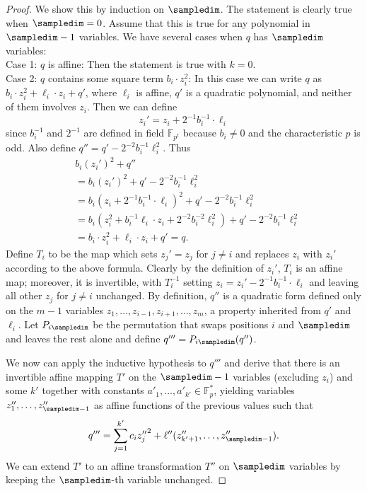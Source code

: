 \begin{proof}
We show this by induction on $\sampledim$. The statement is clearly true when $\sampledim=0$.
Assume that this is true for any polynomial in $\sampledim-1$ variables.
We have several cases when $q$ has $\sampledim$ variables:\\
{\sc Case 1:} $q$ is affine: Then the statement is true with $k=0$.\\
{\sc Case 2:} $q$ contains some square term $b_i\cdot z_i^2$:
In this case we can write $q$ as
$b_i\cdot z_i^2+ \ell_i\cdot z_i+q'$,
where $\ell_i$ is affine, $q'$ is a quadratic polynomial,
and neither of them involves $z_i$.
Then we can define
$$z_i'=z_i+2^{-1}b_i^{-1}\cdot \ell_i$$
since $b_i^{-1}$ and $2^{-1}$ are defined in
field $\mathbb{F}_{p^t}$ because $b_i\ne 0$ and the characteristic $p$ is odd.
Also define $q''=q'-2^{-2}b_i^{-1}\ell_i^2$. 
Thus 
\begin{align*}
&b_i(z_i')^2+q''\\
&=b_i(z_i')^2+q'-2^{-2}b_i^{-1}\ell_i^2\\
&=b_i(z_i +2^{-1}b_i^{-1}\cdot \ell_i)^2+q'-2^{-2} b_i^{-1}\ell_i^2\\
&=b_i(z_i^2 + b_i^{-1}\ell_i \cdot z_i + 2^{-2}b_i^{-2}\ell_i^2)
+q'-2^{-2} b_i^{-1}\ell_i^2\\
&=b_i\cdot z_i^2 + \ell_i \cdot z_i +q' =q.
\end{align*}
Define $T_i$ to be the map which sets $z_j'=z_j$ for
$j\ne i$ and replaces $z_i$ with $z_i'$ according to the above
formula.
Clearly by the definition of $z_i'$, $T_i$ is an affine map; moreover,
it is invertible, with $T_i^{-1}$ setting $z_i=z_i' -2^{-1}b_i^{-1}\cdot \ell_i$
and leaving all other $z_j$ for $j\ne i$ unchanged.
By definition, $q''$ is a quadratic form defined only on the $m-1$ variables
$z_1,\ldots,z_{i-1},z_{i+1},\ldots,z_m$, a property inherited from $q'$ and
$\ell_i$.  Let $P_{i\sampledim}$ be the permutation that swaps positions $i$ and
$\sampledim$ and leaves the rest alone and define $q'''=P_{i\sampledim}(q'')$.

We now can apply the inductive hypothesis to $q'''$ and derive that there
is an invertible affine mapping $T'$ on the $\sampledim-1$ variables (excluding $z_i$)
and some $k'$ together with constants $a'_{1},\ldots,a'_{k'}\in \mathbb{F}_p^*$,
yielding variables $z''_1,\ldots,z''_{\sampledim-1}$ as affine functions of the
previous values such that 
$$q'''=\sum_{j=1}^{k'} c_i{z_{j}''}^2+\ell''(z''_{k'+1},\ldots,z''_{\sampledim-1}).$$
We can extend $T'$ to an affine transformation $T''$ on $\sampledim$ variables 
by keeping the $\sampledim$-th variable unchanged.  


\end{proof}
